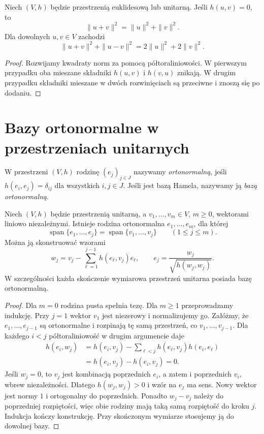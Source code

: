 \begin{wniosek}
\label{cor:lin12-pitagoras}
Niech \((V,h)\) będzie przestrzenią
euklidesową lub unitarną.
Jeśli \(h(u,v)=0\), to
\[
 \|u+v\|^2=\|u\|^2+\|v\|^2.
\]
Dla dowolnych \(u,v\in V\) zachodzi
\[
 \|u+v\|^2+\|u-v\|^2
 =2\|u\|^2+2\|v\|^2.
\]
\end{wniosek}
\begin{proof}
Rozwijamy kwadraty norm za pomocą
półtoraliniowości. W pierwszym
przypadku oba mieszane składniki
\(h(u,v)\) i \(h(v,u)\) znikają.
W drugim przypadku składniki
mieszane w dwóch rozwinięciach
są przeciwne i znoszą się po dodaniu.
\end{proof}

\section{Bazy ortonormalne w przestrzeniach unitarnych}
\label{sec:lin12-bazy}

\begin{definicja}
\label{def:lin12-ortonormalna}
W przestrzeni \((V,h)\) rodzinę
\((e_j)_{j\in J}\) nazywamy
\emph{ortonormalną}, jeśli
\(h(e_i,e_j)=\delta_{ij}\)
dla wszystkich \(i,j\in J\).
Jeśli jest bazą Hamela,
nazywamy ją \emph{bazą ortonormalną}.
\end{definicja}

\begin{twierdzenie}
\label{thm:lin12-gram-schmidt}
Niech \((V,h)\) będzie przestrzenią
unitarną, a \(v_1,\ldots,v_m\in V\),
\(m\ge0\), wektorami liniowo niezależnymi.
Istnieje rodzina ortonormalna
\(e_1,\ldots,e_m\), dla której
\[
 \operatorname{span}\{e_1,\ldots,e_j\}
 =\operatorname{span}\{v_1,\ldots,v_j\}
 \qquad(1\le j\le m).
\]
Można ją skonstruować wzorami
\[
 w_j=v_j-\sum_{\ell=1}^{j-1}
            h(e_\ell,v_j)e_\ell,
 \qquad
 e_j=\frac{w_j}{\sqrt{h(w_j,w_j)}}.
\]
W szczególności każda skończenie
wymiarowa przestrzeń unitarna
posiada bazę ortonormalną.
\end{twierdzenie}
\begin{proof}
Dla \(m=0\) rodzina pusta
spełnia tezę. Dla \(m\ge1\)
przeprowadzamy indukcję.
Przy \(j=1\) wektor \(v_1\)
jest niezerowy i normalizujemy go.
Załóżmy, że
\(e_1,\ldots,e_{j-1}\)
są ortonormalne i
rozpinają tę samą przestrzeń,
co \(v_1,\ldots,v_{j-1}\).
Dla każdego \(i<j\)
półtoraliniowość w drugim
argumencie daje
\[
 \begin{aligned}
 h(e_i,w_j)
 &=h(e_i,v_j)
   -\sum_{\ell<j}h(e_\ell,v_j)h(e_i,e_\ell)\\
 &=h(e_i,v_j)-h(e_i,v_j)=0.
 \end{aligned}
\]
Jeśli \(w_j=0\), to \(v_j\)
jest kombinacją poprzednich \(e_i\),
a zatem i poprzednich \(v_i\),
wbrew niezależności.
Dlatego \(h(w_j,w_j)>0\)
i wzór na \(e_j\) ma sens.
Nowy wektor jest normy \(1\)
i ortogonalny do poprzednich.
Ponadto \(w_j-v_j\) należy
do poprzedniej rozpiętości,
więc obie rodziny mają
taką samą rozpiętość do kroku \(j\).
Indukcja kończy konstrukcję.
Przy skończonym wymiarze
stosujemy ją do dowolnej bazy.
\end{proof}

